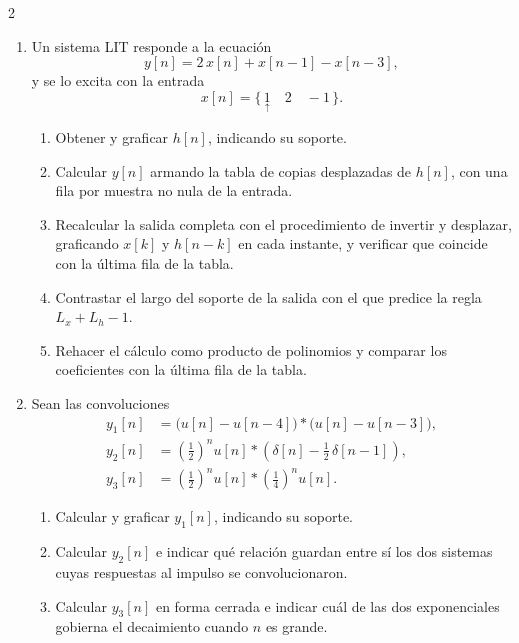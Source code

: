 \documentclass[10pt,a4paper]{article}
\begin{document}
\begin{multicols}{2}
\begin{enumerate}
		\item Un sistema LIT responde a la ecuación
		\[
			y[n] = 2\,x[n] + x[n-1] - x[n-3],
		\]
		y se lo excita con la entrada
		\[
			x[n] = \{\, \underset{\uparrow}{1} \quad 2 \quad -1 \,\}.
		\]
		\begin{enumerate}
			\item Obtener y graficar $h[n]$, indicando su soporte.
			\item Calcular $y[n]$ armando la tabla de copias desplazadas de
			$h[n]$, con una fila por muestra no nula de la entrada.
			\item Recalcular la salida completa con el procedimiento de
			invertir y desplazar, graficando $x[k]$ y $h[n-k]$ en cada
			instante, y verificar que coincide con la última fila de la
			tabla.
			\item Contrastar el largo del soporte de la salida con el que
			predice la regla $L_x + L_h - 1$.
			\item Rehacer el cálculo como producto de polinomios y comparar
			los coeficientes con la última fila de la tabla.
		\end{enumerate}

		\item Sean las convoluciones
		\begin{align*}
			y_1[n] &= \bigl(u[n]-u[n-4]\bigr) * \bigl(u[n]-u[n-3]\bigr), \\
			y_2[n] &= \left(\tfrac{1}{2}\right)^{\!n} u[n] *
			          \left(\delta[n]-\tfrac{1}{2}\,\delta[n-1]\right), \\
			y_3[n] &= \left(\tfrac{1}{2}\right)^{\!n} u[n] *
			          \left(\tfrac{1}{4}\right)^{\!n} u[n].
		\end{align*}
		\begin{enumerate}
			\item Calcular y graficar $y_1[n]$, indicando su soporte.
			\item Calcular $y_2[n]$ e indicar qué relación guardan entre sí
			los dos sistemas cuyas respuestas al impulso se convolucionaron.
			\item Calcular $y_3[n]$ en forma cerrada e indicar cuál de las dos
			exponenciales gobierna el decaimiento cuando $n$ es grande.
		\end{enumerate}


\end{enumerate}
\end{multicols}
\end{document}
